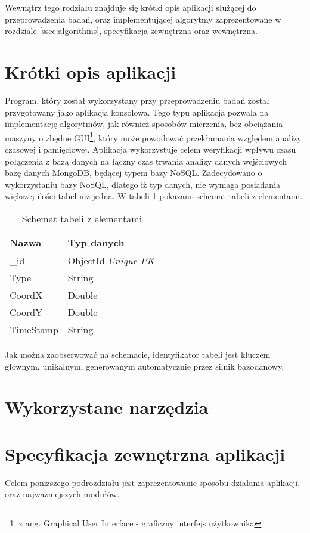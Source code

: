 Wewnątrz tego rodziału znajduje się krótki opis aplikacji służącej do przeprowadzenia badań, oraz implementującej algorytmy zaprezentowane w rozdziale \ref{ssec:algorithms}, specyfikacja zewnętrzna oraz wewnętrzna.
\section{Krótki opis aplikacji}
\label{sec:shortdesc}
Program, który został wykorzystany przy przeprowadzeniu badań został przygotowany jako aplikacja konsolowa. Tego typu aplikacja pozwala na implementację algorytmów, jak również sposobów mierzenia, bez obciążania maszyny o zbędne GUI\footnote{z ang. Graphical User Interface - graficzny interfejs użytkownika}, który może powodować przekłamania względem analizy czasowej i pamięciowej. Aplikacja wykorzystuje celem weryfikacji wpływu czasu połączenia z bazą danych na łączny czas trwania analizy danych wejściowych bazę danych MongoDB, będącej typem bazy NoSQL. Zadecydowano o wykorzystaniu bazy NoSQL, dlatego iż typ danych, nie wymaga posiadania większej ilości tabel niż jedna. W tabeli \ref{tab:nosqlschema} pokazano schemat tabeli z elementami.
\begin{table}[H]
    \centering
    \begin{tabular}{|l|l|}
    \hline
    \textbf{Nazwa} & \textbf{Typ danych} \\ \hline
    \_id           & ObjectId \textit{Unique PK} \\ \hline
    Type           & String              \\ \hline
    CoordX         & Double              \\ \hline
    CoordY         & Double              \\ \hline
    TimeStamp      & String              \\ \hline
    \end{tabular}
    \caption{Schemat tabeli z elementami}
    \label{tab:nosqlschema}
\end{table}
Jak można zaobserwować na schemacie, identyfikator tabeli jest kluczem głównym, unikalnym, generowanym automatycznie przez silnik bazodanowy.
\section{Wykorzystane narzędzia}
\label{sec:calibration}
\section{Specyfikacja zewnętrzna aplikacji}
Celem poniższego podrozdziału jest zaprezentowanie sposobu działania aplikacji, oraz najważniejszych modułów.
